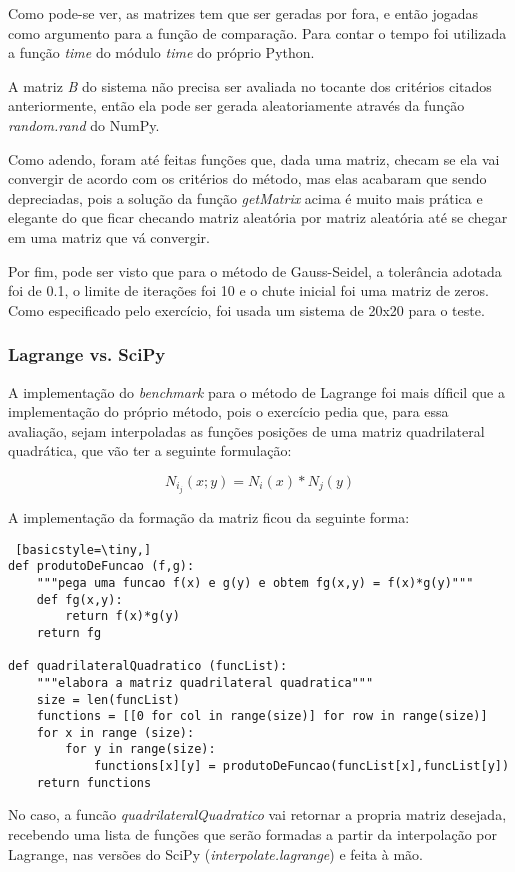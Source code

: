 \documentclass[12pt,A4]{report}
\begin{document}
Como pode-se ver, as matrizes tem que ser geradas por fora, e então jogadas como argumento para a função de comparação. Para contar o tempo foi utilizada a função \textit{time} do módulo \textit{time} do próprio Python.

A matriz \textit{B} do sistema não precisa ser avaliada no tocante dos critérios citados anteriormente, então ela pode ser gerada aleatoriamente através da função \textit{random.rand} do NumPy.

Como adendo, foram até feitas funções que, dada uma matriz, checam se ela vai convergir de acordo com os critérios do método, mas elas acabaram que sendo depreciadas, pois a solução da função \textit{getMatrix} acima é muito mais prática e elegante do que ficar checando matriz aleatória por matriz aleatória até se chegar em uma matriz que vá convergir.

Por fim, pode ser visto que para o método de Gauss-Seidel, a tolerância adotada foi de 0.1, o limite de iterações foi 10 e o chute inicial foi uma matriz de zeros. Como especificado pelo exercício, foi usada um sistema de 20x20 para o teste.

\subsubsection{Lagrange vs. SciPy}
A implementação do \textit{benchmark} para o método de Lagrange foi mais díficil que a implementação do próprio método, pois o exercício pedia que, para essa avaliação, sejam interpoladas as funções posições de uma matriz quadrilateral quadrática, que vão ter a seguinte formulação:

\begin{equation}
    N_i_j (x;y) = N_i(x) * N_j(y) 
\end{equation}

A implementação da formação da matriz ficou da seguinte forma:

\begin{lstlisting} [basicstyle=\tiny,]
def produtoDeFuncao (f,g):
    """pega uma funcao f(x) e g(y) e obtem fg(x,y) = f(x)*g(y)"""
    def fg(x,y):
        return f(x)*g(y)
    return fg

def quadrilateralQuadratico (funcList):
    """elabora a matriz quadrilateral quadratica"""
    size = len(funcList)
    functions = [[0 for col in range(size)] for row in range(size)]
    for x in range (size):
        for y in range(size):
            functions[x][y] = produtoDeFuncao(funcList[x],funcList[y])
    return functions
\end{lstlisting}
No caso, a funcão \textit{quadrilateralQuadratico} vai retornar a propria matriz desejada, recebendo uma lista de funções que serão formadas a partir da interpolação por Lagrange, nas versões do SciPy (\textit{interpolate.lagrange}) e feita à mão.
\end{document}
